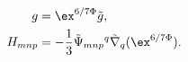 \begin{equation}
\label{confspin7}
\begin{aligned}
   g &= \ex^{6/7\Phi}\tilde g , \\
   H_{mnp} &= 
      -\frac{1}{3}\tilde \Psi_{mnp}{}^q\tilde\nabla_q(\ex^{6/7\Phi}) .
\end{aligned}
\end{equation}

